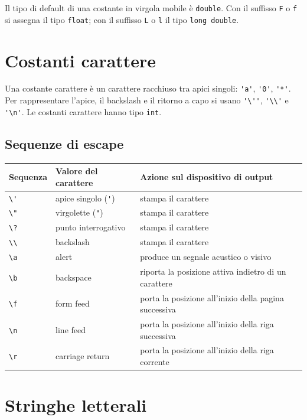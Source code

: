\documentclass[11pt,a4paper]{article}
\begin{document}
Il tipo di default di una costante in virgola mobile è \lstinline|double|. Con il suffisso \lstinline|F| o \lstinline|f| si assegna il tipo \lstinline|float|; con il suffisso \lstinline|L| o \lstinline|l| il tipo \lstinline|long double|.

\section{Costanti carattere}

Una costante carattere è un carattere racchiuso tra apici singoli: \lstinline|'a'|, \lstinline|'0'|, \lstinline|'*'|. Per rappresentare l'apice, il backslash e il ritorno a capo si usano \lstinline|'\''|, \lstinline|'\\'| e \lstinline|'\n'|. Le costanti carattere hanno tipo \lstinline|int|.

\subsection{Sequenze di escape}

\begin{center}
\begin{tabular}{@{}lll@{}}
\toprule
Sequenza & Valore del carattere & Azione sul dispositivo di output \\
\midrule
\verb|\'| & apice singolo (\lstinline|'|) & stampa il carattere \\
\verb|\"| & virgolette (\lstinline|"|) & stampa il carattere \\
\verb|\?| & punto interrogativo & stampa il carattere \\
\verb|\\| & backslash & stampa il carattere \\
\verb|\a| & alert & produce un segnale acustico o visivo \\
\verb|\b| & backspace & riporta la posizione attiva indietro di un carattere \\
\verb|\f| & form feed & porta la posizione all'inizio della pagina successiva \\
\verb|\n| & line feed & porta la posizione all'inizio della riga successiva \\
\verb|\r| & carriage return & porta la posizione all'inizio della riga corrente \\
\bottomrule
\end{tabular}
\end{center}

\section{Stringhe letterali}
\end{document}
